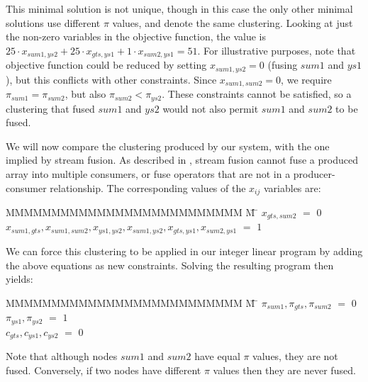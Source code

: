 This minimal solution is not unique, though in this case the only other minimal solutions use different $\pi$ values, and denote the same clustering. Looking at just the non-zero variables in the objective function, the value is $25 \cdot x_{sum1,ys2} + 25 \cdot x_{gts,ys1} + 1 \cdot x_{sum2, ys1} = 51$. For illustrative purposes, note that objective function could be reduced by setting $x_{sum1,ys2} = 0$ (fusing $sum1$ and $ys1$), but this conflicts with other constraints. Since $x_{sum1, sum2} = 0$, we require $\pi_{sum1} = \pi_{sum2}$, but also \mbox{$\pi_{sum2} < \pi_{ys2}$}. These constraints cannot be satisfied, so a clustering that fused $sum1$ and $ys2$ would not also permit $sum1$ and $sum2$ to be fused.

We will now compare the clustering produced by our system, with the one implied by stream fusion. As described in \cite{lippmeier2013flow}, stream fusion cannot fuse a produced array into multiple consumers, or fuse operators that are not in a producer-consumer relationship. The corresponding values of the $x_{ij}$ variables are:
\begin{tabbing}
MMMMMMMMMMMMMMMMMMMMMMMMMM \= M \= \kill
$x_{gts, sum2}$
    \> $=$ \> $0$ \\
$x_{sum1, gts}, x_{sum1, sum2}, x_{ys1,  ys2}, x_{sum1, ys2}, x_{gts, ys1 }, x_{sum2, ys1}$
    \> $=$ \> $1$
\end{tabbing}

We can force this clustering to be applied in our integer linear program by adding the above equations as new constraints. Solving the resulting program then yields:
\begin{tabbing}
MMMMMMMMMMMMMMMMMMMMMMMMMM \= M \= \kill
$\pi_{sum1}, \pi_{gts }, \pi_{sum2}$
    \> $=$ \> $0$ \\
$\pi_{ys1 }, \pi_{ys2 }$
    \> $=$ \> $1$ \\
$c_{gts}, c_{ys1}, c_{ys2}$           
    \> $=$ \> $0$
\end{tabbing}

Note that although nodes $sum1$ and $sum2$ have equal $\pi$ values, they are not fused. Conversely, if two nodes have different $\pi$ values then they are never fused. 



